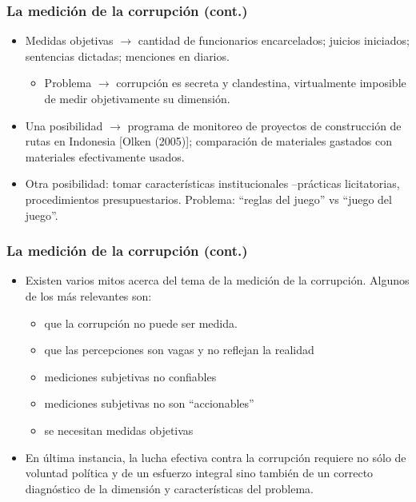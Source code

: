 \documentclass[handout,final,xcolor=dvipsnames]{beamer}
\begin{document}
\begin{frame}\frametitle{La medición de la corrupción (cont.)}
\begin{itemize}\itemsep 10pt
\item Medidas objetivas $\longrightarrow$ cantidad de funcionarios
  encarcelados; juicios iniciados; sentencias dictadas; menciones en
  diarios. 
\begin{itemize}
\item Problema $\longrightarrow$ corrupción es secreta y clandestina,
  virtualmente imposible de medir objetivamente su dimensión. 
\end{itemize}
\item Una posibilidad $\longrightarrow$ programa de monitoreo de proyectos de
  construcción de rutas en Indonesia [Olken (2005)]; comparación de
  materiales gastados con materiales efectivamente usados.
\item Otra posibilidad: tomar características institucionales
  --prácticas licitatorias, procedimientos presupuestarios. Problema:
  ``reglas del juego'' vs ``juego del juego''. 
\end{itemize}
\end{frame}


\begin{frame}\frametitle{La medición de la corrupción (cont.)}
\begin{itemize}\itemsep 10pt
\item Existen varios mitos acerca del tema de la medición de la
  corrupción. Algunos de los más relevantes son:
\begin{itemize}\itemsep 10pt
\item que la corrupción no puede ser medida. 
\item que las percepciones son vagas y no reflejan la realidad
\item mediciones subjetivas no confiables 
\item mediciones subjetivas no son ``accionables''
\item se necesitan medidas objetivas
\end{itemize}
\item En última instancia, la lucha efectiva contra la corrupción
  requiere no sólo de voluntad política y de un esfuerzo integral sino
  también de un correcto diagnóstico de la dimensión y características
  del problema. 
\end{itemize}
\end{frame}
\end{document}
